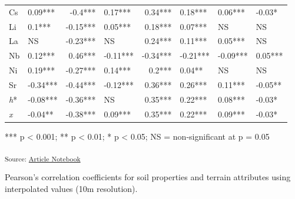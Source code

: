 \documentclass[
  number]{elsarticle}
\begin{document}
\begin{longtable*}{llrlrlll}
Cs & 0.09*** & -0.4*** & 0.17*** & 0.34*** & 0.18*** & 0.06*** & -0.03* \\ 
Li & 0.1*** & -0.15*** & 0.05*** & 0.18*** & 0.07*** & NS & NS \\ 
La & NS & -0.23*** & NS & 0.24*** & 0.11*** & 0.05*** & NS \\ 
Nb & 0.12*** & 0.46*** & -0.11*** & -0.34*** & -0.21*** & -0.09*** & 0.05*** \\ 
Ni & 0.19*** & -0.27*** & 0.14*** & 0.2*** & 0.04** & NS & NS \\ 
Sr & -0.34*** & -0.44*** & -0.12*** & 0.36*** & 0.26*** & 0.11*** & -0.05** \\ 
\emph{h}* & -0.08*** & -0.36*** & NS & 0.35*** & 0.22*** & 0.08*** & -0.03* \\ 
\emph{x} & -0.04** & -0.38*** & 0.09*** & 0.35*** & 0.22*** & 0.09*** & -0.03* \\ 
\bottomrule
\end{longtable*}
\begin{minipage}{\linewidth}
*** p < 0.001; ** p < 0.01; * p < 0.05; NS = non-significant at p = 0.05\\
\end{minipage}

\textsubscript{Source:
\href{https://alex-koiter.github.io/spatial-variability-soil-manuscript/index.qmd.html}{Article
Notebook}}

Pearson's correlation coefficients for soil properties and terrain
attributes using interpolated values (10m resolution).
\end{document}
